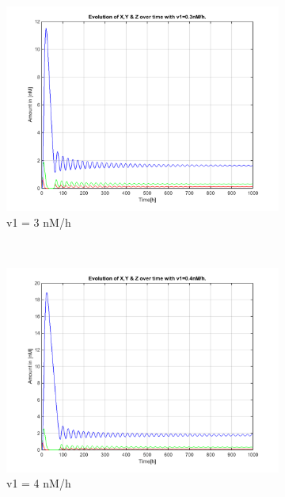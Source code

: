 \documentclass[10pt,a4paper,oneside,twocolumn]{article}
\numberwithin{equation}{section} %
\begin{document}
\begin{figure}
	\begin{subfigure}[b]{0.3\textwidth}
	    \includegraphics[width=\textwidth]{LotsofthesameA/A-A3.png}
	    \caption{v1 = 3 nM/h}
	\end{subfigure}
	~ 
	\begin{subfigure}[b]{0.3\textwidth}
	    \includegraphics[width=\textwidth]{LotsofthesameA/A-A4.png}
	    \caption{v1 = 4 nM/h}
	\end{subfigure}
	~
	\begin{subfigure}[b]{0.3\textwidth}

\end{subfigure}
\end{figure}
\end{document}
